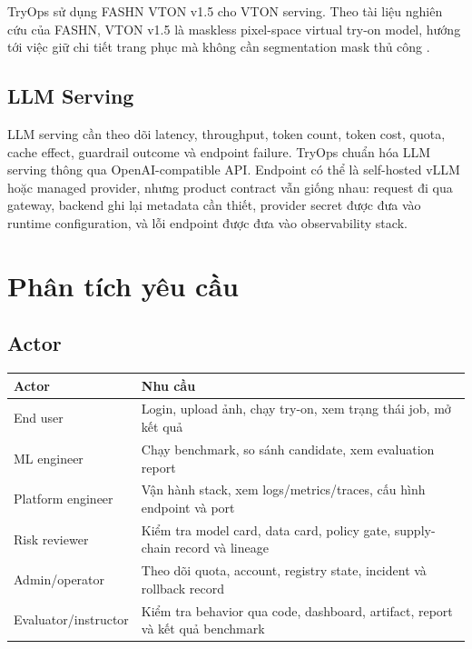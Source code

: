 \documentclass[12pt,a4paper,oneside]{report}
\begin{document}
TryOps sử dụng FASHN VTON v1.5 cho VTON serving. Theo tài liệu nghiên cứu của FASHN, VTON v1.5 là maskless pixel-space virtual try-on model, hướng tới việc giữ chi tiết trang phục mà không cần segmentation mask thủ công \cite{fashn-vton}.

\section{LLM Serving}

LLM serving cần theo dõi latency, throughput, token count, token cost, quota, cache effect, guardrail outcome và endpoint failure. TryOps chuẩn hóa LLM serving thông qua OpenAI-compatible API. Endpoint có thể là self-hosted vLLM hoặc managed provider, nhưng product contract vẫn giống nhau: request đi qua gateway, backend ghi lại metadata cần thiết, provider secret được đưa vào runtime configuration, và lỗi endpoint được đưa vào observability stack.

\chapter{Phân tích yêu cầu}

\section{Actor}

\begin{longtable}{p{4.1cm}p{10.6cm}}
\toprule
\textbf{Actor} & \textbf{Nhu cầu} \\
\midrule
End user & Login, upload ảnh, chạy try-on, xem trạng thái job, mở kết quả \\
ML engineer & Chạy benchmark, so sánh candidate, xem evaluation report \\
Platform engineer & Vận hành stack, xem logs/metrics/traces, cấu hình endpoint và port \\
Risk reviewer & Kiểm tra model card, data card, policy gate, supply-chain record và lineage \\
Admin/operator & Theo dõi quota, account, registry state, incident và rollback record \\
Evaluator/instructor & Kiểm tra behavior qua code, dashboard, artifact, report và kết quả benchmark \\
\bottomrule
\end{longtable}
\end{document}
